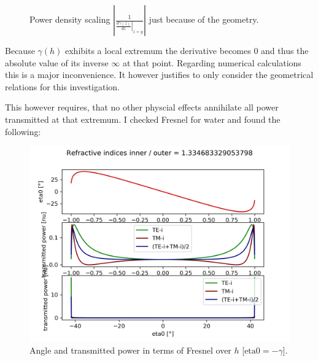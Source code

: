 \documentclass[pagesize=pdftex,paper=a4,fontsize=12pt]{scrartcl}
\newcommand{\abs}[1]{\ensuremath{\left|{#1}\right|}}
\begin{document}
\begin{figure}[H]
	\centering
	\caption{Power density scaling $\abs{\frac{1}{\displaystyle \left.\frac{d\gamma (z)}{dz}\right|_{z=y}}}$ just because of the geometry.}
	\label{fig:invdGammadHOverHExcerpt}
\end{figure}

Because $\gamma (h)$ exhibits a local extremum the derivative becomes $0$ and thus the absolute value of its inverse $\infty$ at that point. Regarding numerical calculations this is a major inconvenience. It however justifies to only consider the geometrical relations for this investigation.

\vspace*{\fill}

This however requires, that no other physcial effects annihilate all power transmitted at that extremum. I checked Fresnel for water and found the following:
\begin{figure}[H]
	\centering
	\includegraphics[trim={0cm 4.12cm 0cm 1cm}, clip, width=12cm]{./Images/results_550.00.png}
	\caption{Angle and transmitted power in terms of Fresnel over $h$ [$\text{eta0} = -\gamma$].}
	\label{fig:waterFresnell}
\end{figure}
\end{document}
